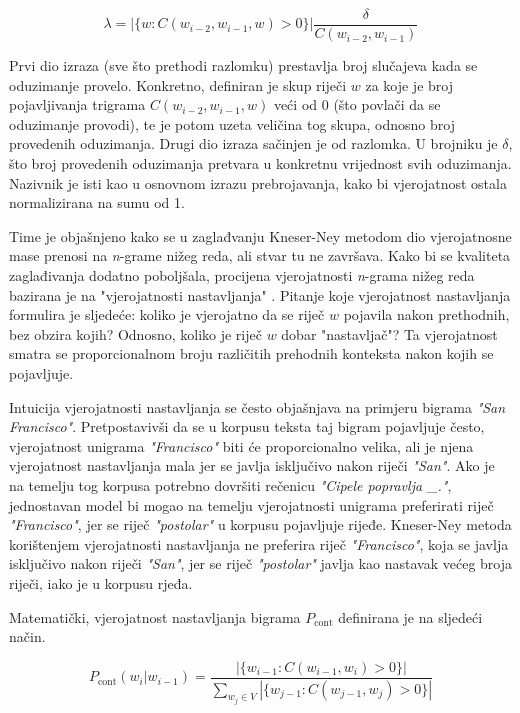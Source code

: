 \documentclass[times, utf8, diplomski, numeric]{fer}
\begin{document}
\[
\lambda = \left|\{w : C(w_{i - 2}, w_{i - 1}, w) > 0\}\right| \frac{\delta}{C(w_{i - 2}, w_{i - 1})} 
\]

Prvi dio izraza (sve što prethodi razlomku) prestavlja broj slučajeva kada se oduzimanje provelo. Konkretno, definiran je skup riječi $w$ za koje je broj pojavljivanja trigrama $C(w_{i - 2}, w_{i - 1}, w)$ veći od $0$ (što povlači da se oduzimanje provodi), te je potom uzeta veličina tog skupa, odnosno broj provedenih oduzimanja. Drugi dio izraza sačinjen je od razlomka. U brojniku je $\delta$, što broj provedenih oduzimanja pretvara u konkretnu vrijednost svih oduzimanja. Nazivnik je isti kao u osnovnom izrazu prebrojavanja, kako bi vjerojatnost ostala normalizirana na sumu od 1.

Time je objašnjeno kako se u zaglađvanju Kneser-Ney metodom dio vjerojatnosne mase prenosi na \textit{n}-grame nižeg reda, ali stvar tu ne završava. Kako bi se kvaliteta zaglađivanja dodatno poboljšala, procijena vjerojatnosti \textit{n}-grama nižeg reda bazirana je na "vjerojatnosti nastavljanja" . Pitanje koje vjerojatnost nastavljanja formulira je sljedeće: koliko je vjerojatno da se riječ $w$ pojavila nakon prethodnih, bez obzira kojih? Odnosno, koliko je riječ $w$ dobar "nastavljač"? Ta vjerojatnost smatra se proporcionalnom broju različitih prehodnih konteksta nakon kojih se pojavljuje.

Intuicija vjerojatnosti nastavljanja se često objašnjava na primjeru bigrama \textit{"San Francisco"}. Pretpostavivši da se u korpusu teksta taj bigram pojavljuje često, vjerojatnost unigrama \textit{"Francisco"} biti će proporcionalno velika, ali je njena vjerojatnost nastavljanja mala jer se javlja isključivo nakon riječi \textit{"San"}. Ako je na temelju tog korpusa potrebno dovršiti rečenicu \textit{"Cipele popravlja \_."}, jednostavan model bi mogao na temelju vjerojatnosti unigrama preferirati riječ \textit{"Francisco"}, jer se riječ \textit{"postolar"} u korpusu pojavljuje rijeđe. Kneser-Ney metoda korištenjem vjerojatnosti nastavljanja ne preferira riječ \textit{"Francisco"}, koja se javlja isključivo nakon riječi \textit{"San"}, jer se riječ \textit{"postolar"} javlja kao nastavak većeg broja riječi, iako je u korpusu rjeđa.

Matematički, vjerojatnost nastavljanja bigrama $P_{\text{cont}}$ definirana je na sljedeći način.

\[
P_{\text{cont}}(w_i | w_{i - 1}) =
  \frac{\left|\{w_{i - 1} : C(w_{i - 1}, w_i) > 0\}\right|}
  {\sum_{w_j \in V}\left|\{w_{j - 1} : C(w_{j - 1}, w_j) > 0\}\right|}
\]
\end{document}
